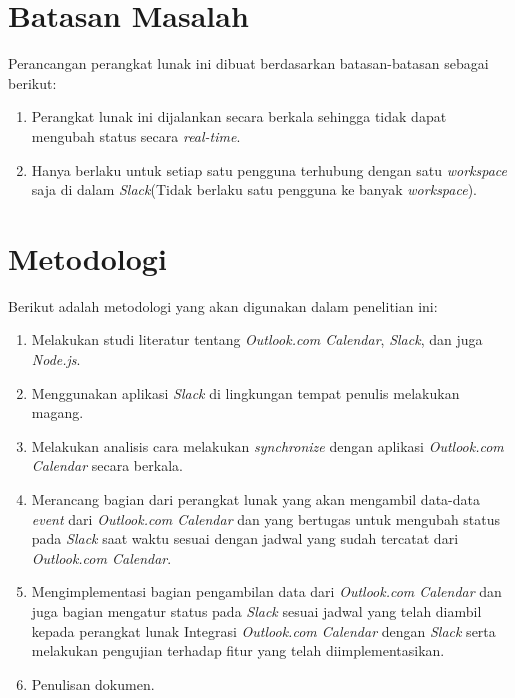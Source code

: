 \section{Batasan Masalah}
\label{sec:batasan}
Perancangan perangkat lunak ini dibuat berdasarkan batasan-batasan sebagai berikut: 
\begin{enumerate}
	\item Perangkat lunak ini dijalankan secara berkala sehingga tidak dapat mengubah status secara \textit{real-time}. 
	\item Hanya berlaku untuk setiap satu pengguna terhubung dengan satu \textit{workspace} saja di dalam \textit{Slack}(Tidak berlaku satu pengguna ke banyak \textit{workspace}). 
\end{enumerate}

\section{Metodologi}
\label{sec:metlit}
Berikut adalah metodologi yang akan digunakan dalam penelitian ini: 
\begin{enumerate}
	\item Melakukan studi literatur tentang \textit{Outlook.com Calendar}, \textit{Slack}, dan juga \textit{Node.js}.
	\item Menggunakan aplikasi \textit{Slack} di lingkungan tempat penulis melakukan magang. 
	\item Melakukan analisis cara melakukan \textit{synchronize} dengan aplikasi \textit{Outlook.com Calendar} secara berkala. 
	\item Merancang bagian dari perangkat lunak yang akan mengambil data-data \textit{event} dari \textit{Outlook.com Calendar} dan yang bertugas untuk mengubah status pada \textit{Slack} saat waktu sesuai dengan jadwal yang sudah tercatat dari \textit{Outlook.com Calendar}.
	\item Mengimplementasi bagian pengambilan data dari \textit{Outlook.com Calendar} dan juga bagian mengatur status pada \textit{Slack} sesuai jadwal yang telah diambil kepada perangkat lunak Integrasi \textit{Outlook.com Calendar} dengan \textit{Slack} serta melakukan pengujian terhadap fitur yang telah diimplementasikan.
	\item Penulisan dokumen. 
\end{enumerate}

